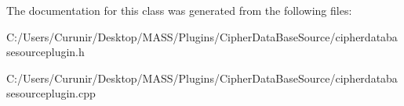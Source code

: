 The documentation for this class was generated from the following files\+:\begin{DoxyCompactItemize}
\item 
C\+:/\+Users/\+Curunir/\+Desktop/\+M\+A\+S\+S/\+Plugins/\+Cipher\+Data\+Base\+Source/cipherdatabasesourceplugin.\+h\item 
C\+:/\+Users/\+Curunir/\+Desktop/\+M\+A\+S\+S/\+Plugins/\+Cipher\+Data\+Base\+Source/cipherdatabasesourceplugin.\+cpp\end{DoxyCompactItemize}
